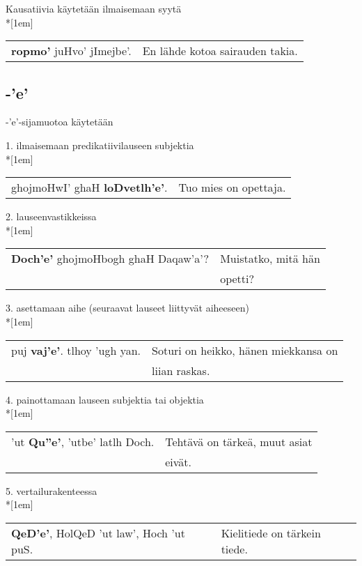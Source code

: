 \documentclass{book}
\begin{document}
Kausatiivia käytetään ilmaisemaan syytä\\*[1em]
\begin{tabular}{l l}
    \textbf{ropmo'} juHvo' jImejbe'. & En lähde kotoa sairauden takia. \\
\end{tabular}

\subsection{-'e'}

-'e'-sijamuotoa käytetään

1. ilmaisemaan predikatiivilauseen subjektia\\*[1em]
\begin{tabular}{l l}
    ghojmoHwI' ghaH \textbf{loDvetlh'e'}. & Tuo mies on opettaja. \\
\end{tabular}

2. lauseenvastikkeissa\\*[1em]
\begin{tabular}{l l}
    \textbf{Doch'e'} ghojmoHbogh ghaH Daqaw'a'? & Muistatko, mitä hän \\
    & opetti? \\
\end{tabular}

3. asettamaan aihe (seuraavat lauseet liittyvät aiheeseen)\\*[1em]
\begin{tabular}{l l}
    puj \textbf{vaj'e'}. tlhoy 'ugh yan. & Soturi on heikko, hänen miekkansa on \\
    & liian raskas. \\
\end{tabular}

4. painottamaan lauseen subjektia tai objektia\\*[1em]
\begin{tabular}{l l}
    'ut \textbf{Qu''e'}, 'utbe' latlh Doch. & Tehtävä on tärkeä, muut asiat \\
    & eivät. \\
\end{tabular}

5. vertailurakenteessa\\*[1em]
\begin{tabular}{l l}
    \textbf{QeD'e'}, HolQeD 'ut law', Hoch 'ut puS. & Kielitiede on tärkein tiede.
\end{tabular}
\end{document}
